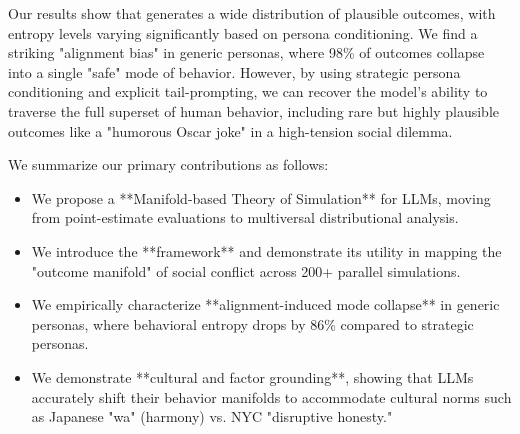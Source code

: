 Our results show that \gpt generates a wide distribution of plausible outcomes, with entropy levels varying significantly based on persona conditioning. We find a striking "alignment bias" in generic personas, where 98\% of outcomes collapse into a single "safe" mode of behavior. However, by using strategic persona conditioning and explicit tail-prompting, we can recover the model's ability to traverse the full superset of human behavior, including rare but highly plausible outcomes like a "humorous Oscar joke" in a high-tension social dilemma.

We summarize our primary contributions as follows:
\begin{itemize}[leftmargin=*,itemsep=0pt,topsep=0pt]
    \item We propose a **Manifold-based Theory of Simulation** for LLMs, moving from point-estimate evaluations to multiversal distributional analysis.
    \item We introduce the **\method framework** and demonstrate its utility in mapping the "outcome manifold" of social conflict across 200+ parallel simulations.
    \item We empirically characterize **alignment-induced mode collapse** in generic personas, where behavioral entropy drops by 86\% compared to strategic personas.
    \item We demonstrate **cultural and factor grounding**, showing that LLMs accurately shift their behavior manifolds to accommodate cultural norms such as Japanese "wa" (harmony) vs. NYC "disruptive honesty."
\end{itemize}
